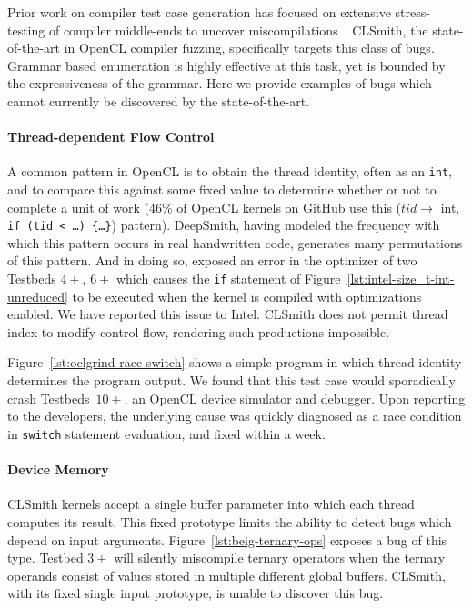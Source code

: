 Prior work on compiler test case generation has focused on extensive stress-testing of compiler middle-ends to uncover miscompilations~\cite{Chen2014a}. CLSmith, the state-of-the-art in OpenCL compiler fuzzing, specifically targets this class of bugs. Grammar based enumeration is highly effective at this task, yet is bounded by the expressiveness of the grammar. Here we provide examples of bugs which cannot currently be discovered by the state-of-the-art.

%
\paragraph{Thread-dependent Flow Control} A common pattern in OpenCL is to obtain the thread identity, often as an \texttt{int}, and to compare this against some fixed value to determine whether or not to complete a unit of work (46\% of OpenCL kernels on GitHub use this ($tid \rightarrow$ int, \texttt{if (tid < \ldots) \{\ldots\}}) pattern). DeepSmith, having modeled the frequency with which this pattern occurs in real handwritten code, generates many permutations of this pattern. And in doing so, exposed an error in the optimizer of two Testbeds $4+$, $6+$ which causes the \texttt{if} statement of Figure~\ref{lst:intel-size_t-int-unreduced} to be executed when the kernel is compiled with optimizations enabled. We have reported this issue to Intel. CLSmith does not permit thread index to modify control flow, rendering such productions impossible.

Figure~\ref{lst:oclgrind-race-switch} shows a simple program in which thread identity determines the program output. We found that this test case would sporadically crash Testbeds~$10\pm$, an OpenCL device simulator and debugger. Upon reporting to the developers, the underlying cause was quickly diagnosed as a race condition in \texttt{switch} statement evaluation, and fixed within a week.

\paragraph{Device Memory} CLSmith kernels accept a single buffer parameter into which each thread computes its result. This fixed prototype limits the ability to detect bugs which depend on input arguments. Figure~\ref{lst:beig-ternary-ops} exposes a bug of this type. Testbed $3\pm$ will silently miscompile ternary operators when the ternary operands consist of values stored in multiple different global buffers. CLSmith, with its fixed single input prototype, is unable to discover this bug. %

